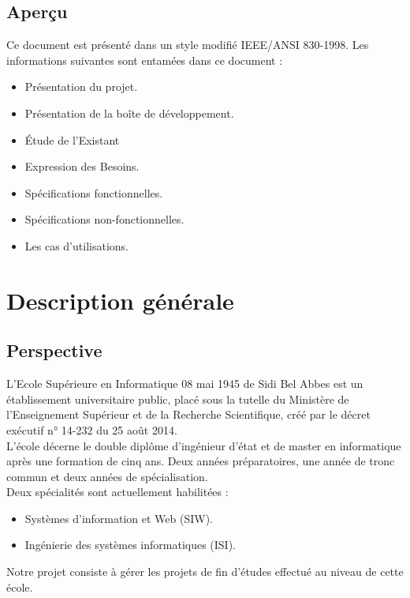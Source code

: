 \documentclass[11pt,fleqn]{book} %
\begin{document}
\section{Aperçu}
Ce document est présenté dans un style modifié IEEE/ANSI 830-1998. Les 
informations suivantes sont entamées dans ce document :
\begin{itemize}
    \item  Présentation du projet. 
    \item Présentation de la boîte de développement. 
    \item Étude de l’Existant 
    \item Expression des Besoins. 
    \item Spécifications fonctionnelles. 
    \item Spécifications non-fonctionnelles. 
    \item Les cas d’utilisations. 
\end{itemize}





\chapter{Description générale}
\section{Perspective}
L’Ecole Supérieure en Informatique 08 mai 1945 de Sidi Bel Abbes est un 
établissement universitaire public, placé sous la tutelle du Ministère de 
l'Enseignement Supérieur et de la Recherche Scientifique, créé par le décret exécutif n° 14-232 du 25 août 2014. \\
L'école décerne le double diplôme d'ingénieur d’état et de master en informatique après une formation de cinq ans. Deux années préparatoires, une année de tronc commun et deux années de spécialisation. \\
Deux spécialités sont actuellement habilitées : 
\begin{itemize}
    \item Systèmes d'information et Web (SIW).
    \item Ingénierie des systèmes informatiques (ISI).
\end{itemize}
Notre projet consiste à gérer les projets de fin d’études effectué au niveau de cette école.
\end{document}
